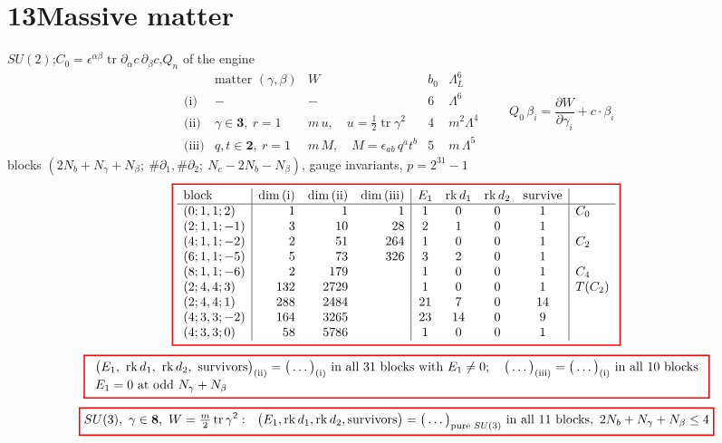 \documentclass[10pt]{article}
\newcommand{\tagbox}[1]{\fbox{\footnotesize #1}}
\newcommand{\sred}[1]{{\setlength{\fboxrule}{1.1pt}\fcolorbox{red}{white}{$\displaystyle #1$}}}
\begin{document}
\section*{13\quad Massive matter}
\tagbox{theories}\quad $SU(2)$;\quad $C_0=\epsilon^{\alpha\beta}\operatorname{tr}\partial_\alpha c\,\partial_\beta c$,\quad $Q_n$ of the engine
\[
\begin{array}{l|l|l|c|c}
 & \text{matter }(\gamma,\beta) & W & b_0 & \Lambda_L^6\\\hline
\text{(i)} & - & - & 6 & \Lambda^6\\
\text{(ii)} & \gamma\in\mathbf 3,\ r=1 & m\,u,\quad u=\tfrac12\operatorname{tr}\gamma^2 & 4 & m^2\Lambda^4\\
\text{(iii)} & q,t\in\mathbf 2,\ r=1 & m\,M,\quad M=\epsilon_{ab}\,q^at^b & 5 & m\,\Lambda^5
\end{array}
\qquad
Q_0\,\beta_i=\frac{\partial W}{\partial\gamma_i}+c\cdot\beta_i
\]
\tagbox{pages}\quad blocks $(2N_b+N_\gamma+N_\beta;\ \#\partial_1,\#\partial_2;\ N_c-2N_b-N_\beta)$, gauge invariants, $p=2^{31}-1$
\[
\sred{\begin{array}{l|rrr|cccc|l}
\text{block} & \dim\text{(i)} & \dim\text{(ii)} & \dim\text{(iii)} & E_1 & \operatorname{rk}d_1 & \operatorname{rk}d_2 & \text{survive} & \\\hline
(0;1,1;2) & 1 & 1 & 1 & 1 & 0 & 0 & 1 & C_0\\
(2;1,1;-1) & 3 & 10 & 28 & 2 & 1 & 0 & 1 & \\
(4;1,1;-2) & 2 & 51 & 264 & 1 & 0 & 0 & 1 & C_2\\
(6;1,1;-5) & 5 & 73 & 326 & 3 & 2 & 0 & 1 & \\
(8;1,1;-6) & 2 & 179 & & 1 & 0 & 0 & 1 & C_4\\
(2;4,4;3) & 132 & 2729 & & 1 & 0 & 0 & 1 & T(C_2)\\
(2;4,4;1) & 288 & 2484 & & 21 & 7 & 0 & 14 & \\
(4;3,3;-2) & 164 & 3265 & & 23 & 14 & 0 & 9 & \\
(4;3,3;0) & 58 & 5786 & & 1 & 0 & 0 & 1 &
\end{array}}
\]
\[
\sred{\begin{array}{l}
\big(E_1,\ \operatorname{rk}d_1,\ \operatorname{rk}d_2,\ \text{survivors}\big)_{\rm(ii)}=\big(\ldots\big)_{\rm(i)}\ \text{in all 31 blocks with }E_1\neq0;\quad
\big(\ldots\big)_{\rm(iii)}=\big(\ldots\big)_{\rm(i)}\ \text{in all 10 blocks}\\[2pt]
E_1=0\ \text{at odd }N_\gamma+N_\beta
\end{array}}
\]
\[
\sred{SU(3),\ \gamma\in\mathbf 8,\ W=\tfrac m2\operatorname{tr}\gamma^2:\ \ \big(E_1,\operatorname{rk}d_1,\operatorname{rk}d_2,\text{survivors}\big)=\big(\ldots\big)_{\text{pure }SU(3)}\ \text{in all 11 blocks},\ 2N_b+N_\gamma+N_\beta\le4}
\]
\end{document}
